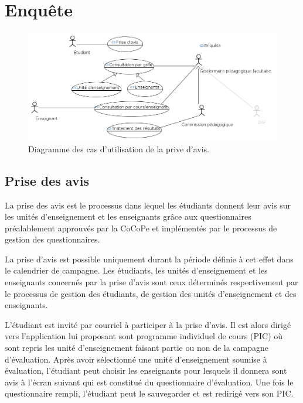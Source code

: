 \documentclass[a4paper,11pt]{report}
\begin{document}
\newpage
\section{Enquête}

\begin{figure}[ht]
\includegraphics[width=\linewidth]{workspace/evalens-usecases/prise_avis.png}
\caption{Diagramme des cas d'utilisation de la prive d'avis.}
\label{fig:usecase-avis}
\end{figure}

\subsection{Prise des avis}
La prise des avis est le processus dans lequel les étudiants donnent leur avis sur les unités d'enseignement et les enseignants grâce aux questionnaires préalablement approuvés par la CoCoPe et implémentés par le processus de gestion des questionnaires.

La prise d'avis est possible uniquement durant la période définie à cet effet dans le calendrier de campagne.
Les étudiants, les unités d'enseignement et les enseignants concernés par la prise d'avis sont ceux déterminés respectivement par le processus de gestion des étudiants, de gestion des unités d'enseignement et des enseignants.

L'étudiant est invité par courriel à participer à la prise d'avis.
Il est alors dirigé vers l'application lui proposant sont programme individuel de cours (PIC) où sont repris les unité d'enseignement faisant partie ou non de la campagne d'évaluation.
Après avoir sélectionné une unité d'enseignement soumise à évaluation, l'étudiant peut choisir les enseignants pour lesquels il donnera sont avis à l'écran suivant qui est constitué du questionnaire d'évaluation.
Une fois le questionnaire rempli, l'étudiant peut le sauvegarder et est redirigé vers son PIC.
\end{document}
